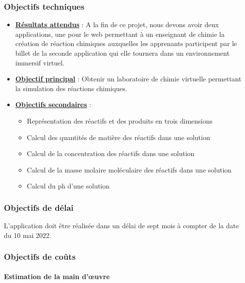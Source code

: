 \subsubsection{Objectifs techniques}
\begin{itemize}
	\item \textbf{\underline{Résultats attendus}} : A la fin de ce projet, nous devons avoir deux applications, une pour le web permettant à un enseignant de chimie la création de réaction chimiques auxquelles les apprenants participent par le billet de la seconde application qui elle tournera dans un environnement immersif virtuel.
	\item \textbf{\underline{Objectif principal}} : Obtenir un laboratoire de chimie virtuelle permettant la simulation des réactions chimiques.
	\item \textbf{\underline{Objectifs secondaires}} :
	      \begin{itemize}
		      \item Représentation des réactifs et des produits en trois dimensions
		      \item Calcul des quantités de matière des réactifs dans une solution
		      \item Calcul de la concentration des réactifs dans une solution
		      \item Calcul de la masse molaire moléculaire des réactifs dans une solution
		      \item Calcul du ph d’une solution
	      \end{itemize}
\end{itemize}

\subsubsection{Objectifs de délai}

L’application doit être réalisée dans un délai de sept mois à compter de la date du 10 mai 2022.

\subsubsection{Objectifs de coûts}

\paragraph{Estimation de la main d’œuvre}


